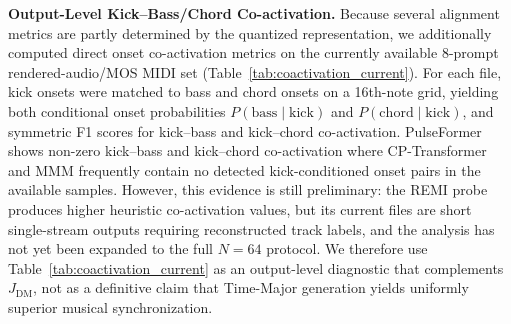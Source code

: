 \documentclass[pdflatex,sn-mathphys-num,twocolumn]{sn-jnl}
\theoremstyle{thmstyleone}
\theoremstyle{thmstyletwo}
\renewcommand{\arraystretch}{0.92}
\begin{document}
\textbf{Output-Level Kick--Bass/Chord Co-activation.}
Because several alignment metrics are partly determined by the quantized representation, we additionally computed direct onset co-activation metrics on the currently available 8-prompt rendered-audio/MOS MIDI set (Table~\ref{tab:coactivation_current}).
For each file, kick onsets were matched to bass and chord onsets on a 16th-note grid, yielding both conditional onset probabilities $P(\mathrm{bass}\mid\mathrm{kick})$ and $P(\mathrm{chord}\mid\mathrm{kick})$, and symmetric F1 scores for kick--bass and kick--chord co-activation.
PulseFormer shows non-zero kick--bass and kick--chord co-activation where CP-Transformer and MMM frequently contain no detected kick-conditioned onset pairs in the available samples.
However, this evidence is still preliminary: the REMI probe produces higher heuristic co-activation values, but its current files are short single-stream outputs requiring reconstructed track labels, and the analysis has not yet been expanded to the full $N=64$ protocol.
We therefore use Table~\ref{tab:coactivation_current} as an output-level diagnostic that complements $J_{\mathrm{DM}}$, not as a definitive claim that Time-Major generation yields uniformly superior musical synchronization.

\begin{tableorg}[!t]
\centering\scriptsize
\setlength{\tabcolsep}{2pt}
\renewcommand{\arraystretch}{0.88}
\caption{Output-level co-activation on the 8-prompt MOS MIDI set. Values are means with bootstrap 95\% CIs; -- indicates no detected kick-conditioned onset pairs.}
\label{tab:coactivation_current}
\end{tableorg}
\end{document}
